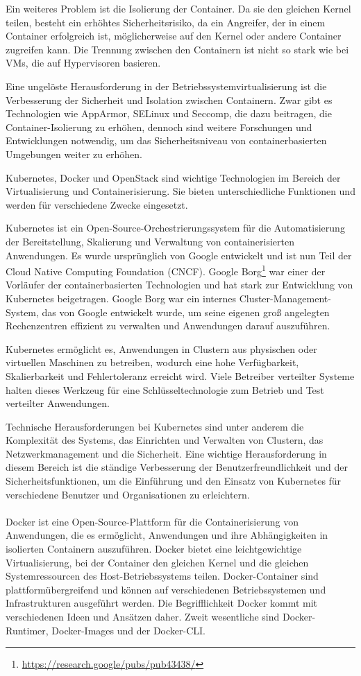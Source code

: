 Ein weiteres Problem ist die Isolierung der Container. Da sie den gleichen Kernel teilen, besteht ein erhöhtes Sicherheitsrisiko, da ein Angreifer, der in einem Container erfolgreich ist, möglicherweise auf den Kernel oder andere Container zugreifen kann. Die Trennung zwischen den Containern ist nicht so stark wie bei VMs, die auf Hypervisoren basieren.

Eine ungelöste Herausforderung in der Betriebssystemvirtualisierung ist die Verbesserung der Sicherheit und Isolation zwischen Containern. Zwar gibt es Technologien wie AppArmor, SELinux und Seccomp, die dazu beitragen, die Container-Isolierung zu erhöhen, dennoch sind weitere Forschungen und Entwicklungen notwendig, um das Sicherheitsniveau von containerbasierten Umgebungen weiter zu erhöhen.

Kubernetes, Docker und OpenStack sind wichtige Technologien im Bereich der Virtualisierung und Containerisierung. Sie bieten unterschiedliche Funktionen und werden für verschiedene Zwecke eingesetzt.

Kubernetes ist ein Open-Source-Orchestrierungssystem für die Automatisierung der Bereitstellung, Skalierung und Verwaltung von containerisierten Anwendungen. Es wurde ursprünglich von Google entwickelt und ist nun Teil der Cloud Native Computing Foundation (CNCF). Google Borg\footnote{\url{https://research.google/pubs/pub43438/}} war einer der Vorläufer der containerbasierten Technologien und hat stark zur Entwicklung von Kubernetes beigetragen.  Google Borg war ein internes Cluster-Management-System, das von Google entwickelt wurde, um seine eigenen groß angelegten Rechenzentren effizient zu verwalten und Anwendungen darauf auszuführen. 

Kubernetes ermöglicht es, Anwendungen in Clustern aus physischen oder virtuellen Maschinen zu betreiben, wodurch eine hohe Verfügbarkeit, Skalierbarkeit und Fehlertoleranz erreicht wird. Viele Betreiber verteilter Systeme halten dieses Werkzeug für eine Schlüsseltechnologie zum Betrieb und Test verteilter Anwendungen.

Technische Herausforderungen bei Kubernetes sind unter anderem die Komplexität des Systems, das Einrichten und Verwalten von Clustern, das Netzwerkmanagement und die Sicherheit. Eine wichtige Herausforderung in diesem Bereich ist die ständige Verbesserung der Benutzerfreundlichkeit und der Sicherheitsfunktionen, um die Einführung und den Einsatz von Kubernetes für verschiedene Benutzer und Organisationen zu erleichtern.
\\\\
Docker ist eine Open-Source-Plattform für die Containerisierung von Anwendungen, die es ermöglicht, Anwendungen und ihre Abhängigkeiten in isolierten Containern auszuführen. Docker bietet eine leichtgewichtige Virtualisierung, bei der Container den gleichen Kernel und die gleichen Systemressourcen des Host-Betriebssystems teilen. Docker-Container sind plattformübergreifend und können auf verschiedenen Betriebssystemen und Infrastrukturen ausgeführt werden. Die Begrifflichkeit Docker kommt mit verschiedenen Ideen und Ansätzen daher. Zweit wesentliche sind Docker-Runtimer, Docker-Images und der Docker-CLI.

